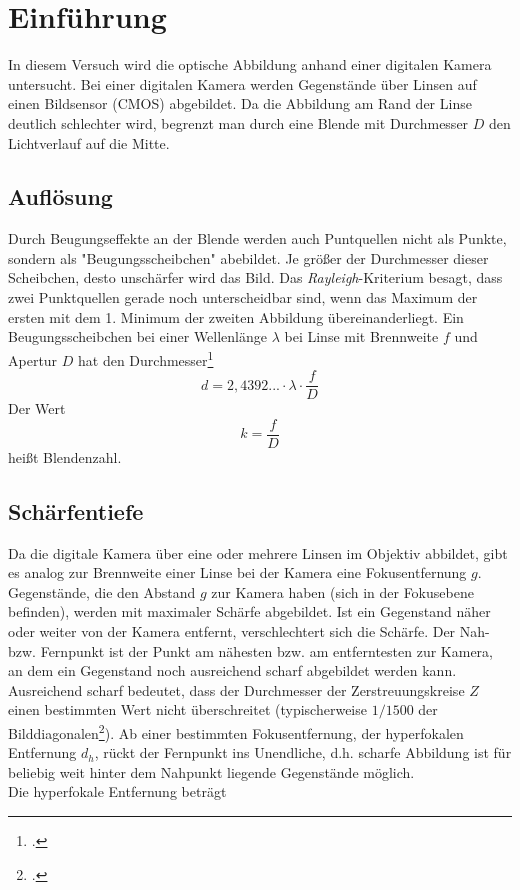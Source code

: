 \section{Einführung}
In diesem Versuch wird die optische Abbildung anhand einer digitalen Kamera untersucht.
Bei einer digitalen Kamera werden Gegenstände über Linsen auf einen Bildsensor (CMOS) abgebildet. Da die Abbildung am Rand der Linse deutlich schlechter wird, begrenzt man durch eine Blende mit Durchmesser $D$ den Lichtverlauf auf die Mitte.

\subsection{Auflösung}
Durch Beugungseffekte an der Blende werden auch Puntquellen nicht als Punkte, sondern als "Beugungsscheibchen" abebildet. Je größer der Durchmesser dieser Scheibchen, desto unschärfer wird das Bild. Das \emph{Rayleigh}-Kriterium besagt, dass zwei Punktquellen gerade noch unterscheidbar sind, wenn das Maximum der ersten mit dem 1. Minimum der zweiten Abbildung übereinanderliegt. Ein Beugungsscheibchen bei einer Wellenlänge $\lambda$ bei Linse mit Brennweite $f$ und Apertur $D$ hat den Durchmesser\footcite{anleitung-ss2015}
\begin{equation}
	d=2,4392...\cdot\lambda\cdot\frac{f}{D}
\label{eq:rayleigh}
\end{equation}
Der Wert 
\begin{equation}
	k=\frac{f}{D}
\label{eq:blendenzahl}
\end{equation}
heißt Blendenzahl.

\subsection{Schärfentiefe}
Da die digitale Kamera über eine oder mehrere Linsen im Objektiv abbildet, gibt es analog zur Brennweite einer Linse bei der Kamera eine Fokusentfernung $g$. Gegenstände, die den Abstand $g$ zur Kamera haben (sich in der Fokusebene befinden), werden mit maximaler Schärfe abgebildet. Ist ein Gegenstand näher oder weiter von der Kamera entfernt, verschlechtert sich die Schärfe. Der Nah- bzw. Fernpunkt ist der Punkt am nähesten bzw. am entferntesten zur Kamera, an dem ein Gegenstand noch ausreichend scharf abgebildet werden kann. Ausreichend scharf bedeutet, dass der Durchmesser der Zerstreuungskreise $Z$ einen bestimmten Wert nicht überschreitet (typischerweise $1/1500$ der Bilddiagonalen\footcite{anleitung-ss2015}). Ab einer bestimmten Fokusentfernung, der hyperfokalen Entfernung $d_h$, rückt der Fernpunkt ins Unendliche, d.h. scharfe Abbildung ist für beliebig weit hinter dem Nahpunkt liegende Gegenstände möglich.
\\
Die hyperfokale Entfernung beträgt

